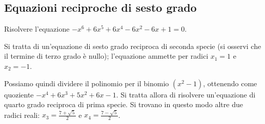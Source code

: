 \subsection{Equazioni reciproche di sesto grado}
\begin{exrig}
 \begin{esempio}
 Risolvere l'equazione $-x^6+6x^5+6x^4-6x^2-6x+1=0$.

 Si tratta di un’equazione di sesto grado reciproca di seconda specie (si osservi che il termine di terzo grado è nullo); l’equazione ammette per radici $x_1=1$ e $x_2=-1$.

 Possiamo quindi dividere il polinomio per il binomio $\left(x^2-1\right)$, ottenendo come quoziente $-x^4+6x^3+5x^2+6x-1$. Si tratta allora di risolvere un’equazione di quarto grado reciproca di prima specie. Si trovano in questo modo altre due radici reali: $x_3=\frac{7+\sqrt 5}{2}$ e $x_4=\frac{7-\sqrt 5} 2$.
 \end{esempio}
\end{exrig}
\newpage
